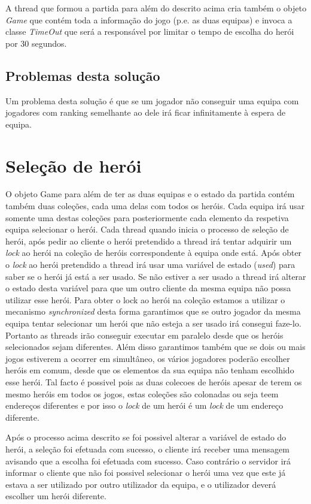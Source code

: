 A thread que formou a partida para além do descrito acima cria também o objeto \textit{Game} que contém toda a informação do jogo (p.e. as duas equipas) e  invoca a classe \textit{TimeOut} que será a responsável por limitar o tempo de escolha do herói por 30 segundos. 

\subsection{Problemas desta solução}
Um problema desta solução é que se um jogador não conseguir uma equipa com jogadores com ranking semelhante ao dele irá ficar infinitamente à espera de equipa.

\section{Seleção de herói}
O objeto Game para além de ter as duas equipas e o estado da partida contém também duas coleções, cada uma delas com todos os heróis. Cada equipa irá usar somente  uma destas coleções para posteriormente cada elemento da respetiva equipa selecionar o herói. 
Cada thread quando inicia o processo de seleção de herói, após pedir ao cliente o herói pretendido a thread irá tentar adquirir um \textit{lock} ao herói na coleção de heróis correspondente à equipa onde está. Após obter o \textit{lock} ao herói pretendido a thread irá usar uma variável de estado (\textit{used}) para saber se o herói já está a ser usado. Se não estiver a ser usado a thread irá alterar o estado desta variável para que um outro cliente da mesma equipa não possa utilizar esse herói. Para obter o lock ao herói na coleção estamos a utilizar o mecanismo \textit{synchronized} desta forma garantimos que se outro jogador da mesma equipa tentar selecionar um herói que não esteja a ser usado irá consegui faze-lo. Portanto as threads irão conseguir executar em paralelo desde que  os heróis selecionados sejam diferentes. Além disso garantimos também que se dois ou mais jogos estiverem a ocorrer em simultâneo, os vários jogadores poderão escolher heróis em comum, desde que os elementos da sua equipa não tenham escolhido esse herói. Tal facto é possivel pois as duas colecoes de heróis apesar de terem os mesmo heróis em todos os jogos, estas coleções são colonadas ou seja teem endereços diferentes e por isso o \textit{lock} de um herói é um \textit{lock} de um endereço diferente. 

Após o processo acima descrito se foi possivel alterar a variável de estado do herói, a seleção foi efetuada com sucesso, o cliente irá receber uma mensagem avisando que a escolha foi efetuada com sucesso. Caso contrário o servidor irá informar o cliente que não foi possivel selecionar o herói uma vez que este já estava a ser utilizado por outro utilizador da equipa, e o utilizador deverá escolher um herói diferente.  

